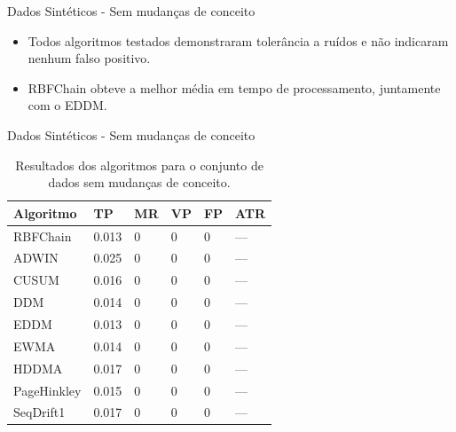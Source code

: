 \documentclass[10pt]{beamer}
\begin{document}
\begin{frame}{Dados Sintéticos -  Sem mudanças de conceito}
    \begin{itemize}
        \item Todos algoritmos testados demonstraram tolerância a ruídos e não indicaram nenhum falso positivo.
        \item RBFChain obteve a melhor média em tempo de processamento, juntamente com o EDDM.
    \end{itemize}
\end{frame}

\begin{frame}{Dados Sintéticos -  Sem mudanças de conceito}
    \begin{table}[h]
        \centering
        \caption{Resultados dos algoritmos para o conjunto de dados sem mudanças de conceito.}
        \label{tbl:exp1}
        \begin{tabular}{llllll}

        \toprule
        Algoritmo              & TP                     & MR                     & VP                     & FP                     & ATR                    \\
        \midrule
        RBFChain               & \alert{0.013}                  & 0                      & 0                      & 0                      & ---                    \\
        ADWIN                  & 0.025                  & 0                      & 0                      & 0                      & ---                    \\
        CUSUM                  & 0.016                  & 0                      & 0                      & 0                      & ---                    \\
        DDM                    & 0.014                  & 0                      & 0                      & 0                      & ---                    \\
        EDDM                   & \alert{0.013}                  & 0                      & 0                      & 0                      & ---                    \\
        EWMA                   & 0.014                  & 0                      & 0                      & 0                      & ---                    \\
        HDDMA                  & 0.017                  & 0                      & 0                      & 0                      & ---                    \\
        PageHinkley            & 0.015                  & 0                      & 0                      & 0                      & ---                    \\
        SeqDrift1              & 0.017                  & 0                      & 0                      & 0                      & ---                    \\
        \bottomrule

        \end{tabular}
    \end{table}
\end{frame}
\end{document}
